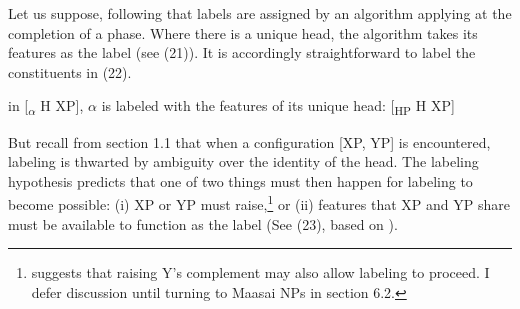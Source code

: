 \documentclass[output=paper
,modfonts
,nonflat]{langsci/langscibook}
\begin{document}
Let us suppose, following \citet{Chomsky2013,Chomsky2015} that labels are assigned by an algorithm applying at the completion of a phase. Where there is a unique head, the algorithm takes its features as the label (see (21)). It is accordingly straightforward to label the constituents in (22).

\begin{exe}
\ex in [\textsubscript{$\alpha$} H XP], $\alpha$ is labeled with the features of its unique head: [\textsubscript{HP} H XP] 
\end{exe}
\begin{exe}
	\ex \oneline{{\lbrack}\textsubscript{$\alpha$} buy [\textsubscript{$\beta$} a [\textsubscript{$\gamma$} \textit{n} book]]]      \textit{is labeled} {\lbrack}\textsubscript{VP} buy [\textsubscript{DP} a [\textsubscript{nP} \textit{n} book]]{\rbrack}}
\end{exe}
But recall from section 1.1 that when a configuration [XP, YP] is encountered, labeling is thwarted by ambiguity over the identity of the head. The labeling hypothesis predicts that one of two things must then happen for labeling to become possible: (i) XP or YP must raise,\footnote{\citet{Chomsky2015} suggests that raising Y’s complement may also allow labeling to proceed. I defer discussion until turning to Maasai NPs in section 6.2.}  or (ii) features that XP and YP share must be available to function as the label (See  (23), based on \citealt[44]{Chomsky2013}).
\end{document}
